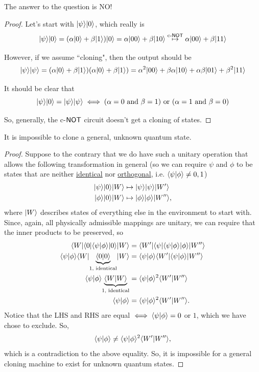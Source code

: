 \documentclass[12pt]{article}
\begin{document}
\begin{proposition}
The answer to the question is NO!
\end{proposition}
\begin{proof}
Let's start with $\Ket{\psi}\Ket{0}$, which really is $$
\Ket{\psi}\Ket{0} = (\alpha \Ket{0} + \beta \Ket{1})\Ket{0} = \alpha \Ket{00} + \beta \Ket{10}\overset{\text{c-}\NOT}{\mapsto}\alpha \Ket{00} + \beta \Ket{11}
$$

\noindent However, if we assume ``cloning", then the output should be $$
\Ket{\psi} \Ket{\psi} = (\alpha \Ket{0} + \beta \Ket{1})(\alpha \Ket{0} + \beta \Ket{1}) = \alpha^2\Ket{00} + \beta\alpha\Ket{10} + \alpha\beta\Ket{01} + \beta^2\Ket{11}
$$

\noindent It should be clear that $$
\Ket{\psi}\Ket{0} = \Ket{\psi} \Ket{\psi}\iff (\alpha = 0\text{ and }\beta = 1)\text{ or }(\alpha = 1\text{ and }\beta = 0)
$$

\noindent So, generally, the c-$\NOT$ circuit doesn't get a cloning of states.
\end{proof}

\begin{theorem}\label{thm:no-clone}
It is impossible to clone a general, unknown quantum state.
\end{theorem}
\begin{proof}
Suppose to the contrary that we do have such a unitary operation that allows the following transformation in general (so we can require $\psi$ and $\phi$ to be states that are neither \underline{identical} nor \underline{orthogonal}, i.e. $\bk{\psi}{\phi} \neq 0,1$) $$
\begin{aligned}
\Ket{\psi}\Ket{0}\Ket{W}
    &\mapsto \Ket{\psi}\Ket{\psi}\Ket{W'}\\
\Ket{\phi}\Ket{0}\Ket{W}
    &\mapsto \Ket{\phi}\Ket{\phi}\Ket{W''},
\end{aligned}
$$ where $\Ket{W}$ describes states of everything else in the environment to start with.\\

\noindent Since, again, all physically admissible mappings are unitary, we can require that the inner products to be preserved, so $$
\begin{aligned}
\Bra{W}\Bra{0}\bk{\psi}{\phi}\Ket{0}\Ket{W}
    &= \Bra{W'}\Bra{\psi}\bk{\psi}{\phi}\Ket{\phi}\Ket{W''}\\
\bk{\psi}{\phi}\Bra{W}\underset{1\text{, identical}}{\underbrace{\bk{0}{0}}}\Ket{W}
    &= \bk{\psi}{\phi}\Bra{W'}\bk{\psi}{\phi}\Ket{W''}\\
\bk{\psi}{\phi}\underset{1\text{, identical}}{\underbrace{\bk{W}{W}}}
    &= \bk{\psi}{\phi}^2\bk{W'}{W''}\\
\bk{\psi}{\phi}
    &= \bk{\psi}{\phi}^2\bk{W'}{W''}.
\end{aligned}
$$ Notice that the LHS and RHS are equal $\iff \bk{\psi}{\phi} = 0$ or $1$, which we have chose to exclude. So, $$
\bk{\psi}{\phi} \neq \bk{\psi}{\phi}^2\bk{W'}{W''},
$$ which is a contradiction to the above equality. So, it is impossible for a general cloning machine to exist for unknown quantum states.
\end{proof}
\end{document}

